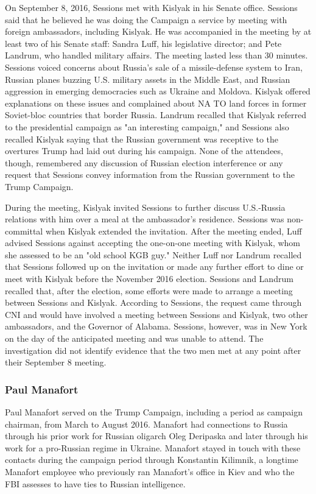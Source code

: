 On September 8, 2016, Sessions met with Kislyak in his Senate office.%
Sessions said that he believed he was doing the Campaign a service by meeting with foreign ambassadors, including Kislyak.%
He was accompanied in the meeting by at least two of his Senate staff: Sandra Luff, his legislative director; and Pete Landrum, who handled military affairs.%
The meeting lasted less than 30 minutes.%
Sessions voiced concerns about Russia's sale of a missile-defense system to Iran, Russian planes buzzing U.S. military assets in the Middle East, and Russian aggression in emerging democracies such as Ukraine and Moldova.%
Kislyak offered explanations on these issues and complained about NA TO land forces in former Soviet-bloc countries that border Russia.%
Landrum recalled that Kislyak referred to the presidential campaign as "an interesting campaign,"%
and Sessions also recalled Kislyak saying that the Russian government was receptive to the overtures Trump had laid out during his campaign.%
None of the attendees, though, remembered any discussion of Russian election interference or any request that Sessions convey information from the Russian government to the Trump Campaign.%

During the meeting, Kislyak invited Sessions to further discuss U.S.-Russia relations with him over a meal at the ambassador's residence.%
Sessions was non-committal when Kislyak extended the invitation.
After the meeting ended, Luff advised Sessions against accepting the one-on-one meeting with Kislyak, whom she assessed to be an "old school KGB guy."%
Neither Luff nor Landrum recalled that Sessions followed up on the invitation or made any further effort to dine or meet with Kislyak before the November 2016 election.%
Sessions and Landrum recalled that, after the election, some efforts were made to arrange a meeting between Sessions and Kislyak.%
According to Sessions, the request came through CNI and would have involved a meeting between Sessions and Kislyak, two other ambassadors, and the Governor of Alabama.%
Sessions, however, was in New York on the day of the anticipated meeting and was unable to attend.%
The investigation did not identify evidence that the two men met at any point after their September 8 meeting.

\subsubsection{Paul Manafort}

Paul Manafort served on the Trump Campaign, including a period as campaign chairman, from March to August 2016.%
Manafort had connections to Russia through his prior work for Russian oligarch Oleg Deripaska and later through his work for a pro-Russian regime in Ukraine.
Manafort stayed in touch with these contacts during the campaign period through Konstantin Kilimnik, a longtime Manafort employee who previously ran Manafort's office in Kiev and who the FBI assesses to have ties to Russian intelligence.

